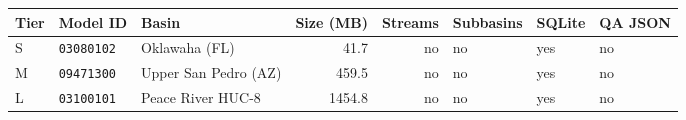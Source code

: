 \begin{tabular}{@{}lllrrlll@{}}
\toprule
Tier & Model ID & Basin & Size (MB) & Streams & Subbasins & SQLite & QA JSON \\
\midrule
S & \texttt{03080102} & Oklawaha (FL) & 41.7 & no & no & yes & no \\
M & \texttt{09471300} & Upper San Pedro (AZ) & 459.5 & no & no & yes & no \\
L & \texttt{03100101} & Peace River HUC-8 & 1454.8 & no & no & yes & no \\
\bottomrule
\end{tabular}

